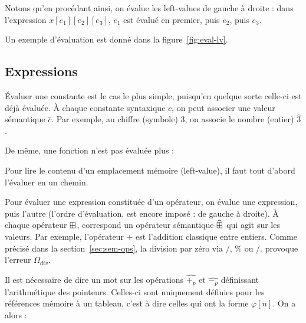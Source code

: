 \begin{mathpar}
\end{mathpar}

Notons qu'en procédant ainsi, on évalue les left-values de gauche à droite :
dans l'expression $x[e_1][e_2][e_3]$, $e_1$ est évalué en premier, puis
$e_2$, puis $e_3$.

Un exemple d'évaluation est donné dans la figure~\ref{fig:eval-lv}.

\subsection*{Expressions}

Évaluer une constante est le cas le plus simple, puisqu'en quelque sorte
celle-ci est déjà évaluée. À chaque constante syntaxique $c$, on peut associer
une valeur sémantique $\widehat{c}$. Par exemple, au chiffre (symbole) $3$, on
associe le nombre (entier) $\widehat{3}$.

\begin{mathpar}
\end{mathpar}

De même, une fonction n'est pas évaluée plus :

\begin{mathpar}
\end{mathpar}


Pour lire le contenu d'un emplacement mémoire (left-value), il faut tout d'abord
l'évaluer en un chemin.

\begin{mathpar}
\end{mathpar}

Pour évaluer une expression constituée d'un opérateur, on évalue une expression,
puis l'autre (l'ordre d'évaluation, est encore imposé : de gauche à droite). À
chaque opérateur $\opbin$, correspond un opérateur sémantique $\widehat{\opbin}$
qui agit sur les valeurs. Par exemple, l'opérateur $\widehat{+}$ est l'addition
classique entre entiers.
Comme précisé dans la section~\ref{sec:sem-ops}, la division par zéro via $/$,
$\%$ ou $/.$ provoque l'erreur $Ω_{div}$.

\begin{mathpar}

\end{mathpar}

Il est nécessaire de dire un mot sur les opérations $\widehat{+_p}$
et $\widehat{-_p}$ définissant l'arithmétique des pointeurs. Celles-ci sont
uniquement définies pour les références mémoire à un tableau, c'est à dire
celles qui ont la forme $φ[n]$. On a alors :

